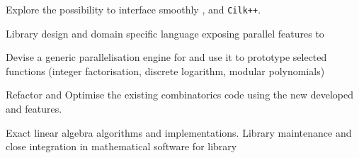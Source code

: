\begin{workpackage}
\begin{wpdelivs}
  \begin{wpdeliv}[due=24,miles=proto1,id=cython-pythran-cilk,dissem=PU,nature=DEM,lead=PS,issue=121]
      {Explore the possibility to interface smoothly \Pythran, \Cython and \texttt{Cilk++}.}
\end{wpdeliv}
  \begin{wpdeliv}[due=24,miles=proto1,id=LinBox-DSL,dissem=PU,nature=R,lead=UJF,issue=122]
    {Library design and domain specific language exposing \Linbox parallel features to \Sage}
  \end{wpdeliv}
  \begin{wpdeliv}[due=24,id=pari-hpc1,dissem=PU,nature=DEM,lead=UB,issue=108]
  {Devise a generic parallelisation engine for \Pari and use it to prototype selected functions (integer factorisation,
  discrete logarithm, modular polynomials)}
  \end{wpdeliv}
  \begin{wpdeliv}[due=36,miles=community,id=sage-HPCcombi,dissem=PU,nature=DEM,lead=UB,issue=109]
      {Refactor and Optimise the existing combinatorics \Sage code using the new developed \Pythran and \Cython features.}
  \end{wpdeliv}
  \begin{wpdeliv}[due=36,miles=community,id=LinBox-algo,dissem=PU,nature=DEM, lead=UJF,issue=110]
    {Exact linear algebra algorithms and implementations. Library maintenance and close integration
      in mathematical software for \Linbox library}
  \end{wpdeliv}

\end{wpdelivs}
\end{workpackage}
